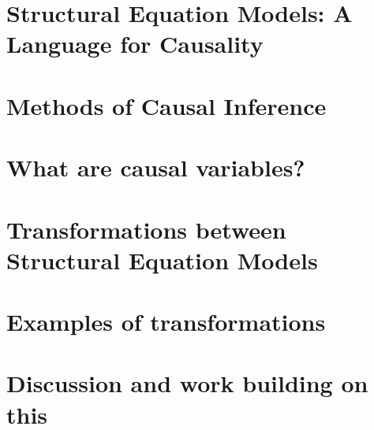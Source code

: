 \section{Structural Equation Models: A Language for Causality}
\section{Methods of Causal Inference}
\section{What are causal variables?}
\section{Transformations between Structural Equation Models}
\section{Examples of transformations}
\section{Discussion and work building on this}
